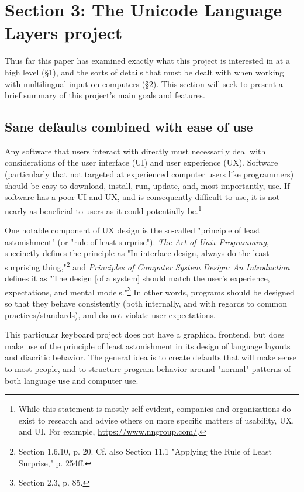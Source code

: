 \documentclass[11pt]{article}
\begin{document}
\section{Section 3: The Unicode Language Layers project}
\label{sec:org4a5d6ff}

Thus far this paper has examined exactly what this project is interested in at a high level (§1), and the sorts of details that must be dealt with when working with multilingual input on computers (§2). This section will seek to present a brief summary of this project's main goals and features.

\subsection{Sane defaults combined with ease of use}
\label{sec:org126b1e1}

Any software that users interact with directly must necessarily deal with considerations of the user interface (UI) and user experience (UX). Software (particularly that not targeted at experienced computer users like programmers) should be easy to download, install, run, update, and, most importantly, use. If software has a poor UI and UX, and is consequently difficult to use, it is not nearly as beneficial to users as it could potentially be.\footnote{While this statement is mostly self-evident, companies and organizations do exist to research and advise others on more specific matters of usability, UX, and UI. For example, \url{https://www.nngroup.com/}.}

One notable component of UX design is the so-called "principle of least astonishment" (or "rule of least surprise"). \emph{The Art of Unix Programming}, succinctly defines the principle as "In interface design, always do the least surprising thing,"\footnote{Section 1.6.10, p. 20. Cf. also Section 11.1 "Applying the Rule of Least Surprise," p. 254ff.} and \emph{Principles of Computer System Design: An Introduction} defines it as "The design [of a system] should match the user's experience, expectations, and mental models."\footnote{Section 2.3, p. 85.} In other words, programs should be designed so that they behave consistently (both internally, and with regards to common practices/standards), and do not violate user expectations.

This particular keyboard project does not have a graphical frontend, but does make use of the principle of least astonishment in its design of language layouts and diacritic behavior. The general idea is to create defaults that will make sense to most people, and to structure program behavior around "normal" patterns of both language use and computer use.
\end{document}
